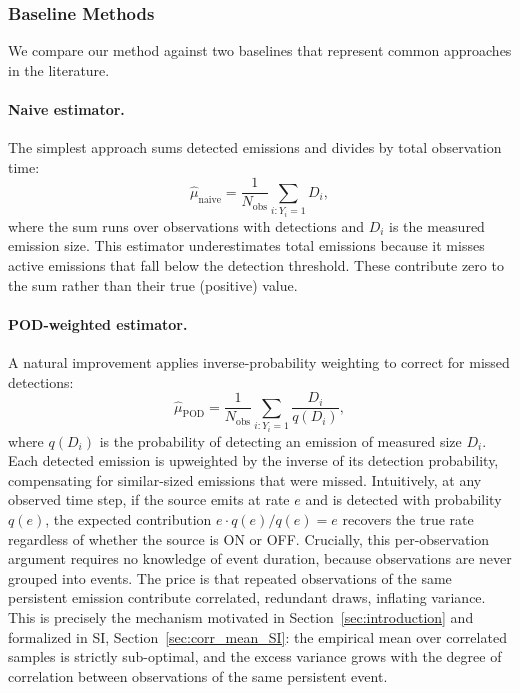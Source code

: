 \documentclass[unnumsec,webpdf,modern,mediumone]{oup-authoring-template}
\newcommand{\new}[1]{{\color{blue}#1}}
\begin{document}
\subsubsection{Baseline Methods}

We compare our method against two baselines that represent common approaches in the literature.

\paragraph{Naive estimator.}
The simplest approach sums detected emissions and divides by total observation time:
\begin{equation}
    \hat{\mu}_{\text{naive}} = \frac{1}{N_{\text{obs}}} \sum_{i: Y_i = 1} D_i,
\end{equation}
where the sum runs over observations with detections and $D_i$ is the measured emission size. This estimator underestimates total emissions because it misses active emissions that fall below the detection threshold. These contribute zero to the sum rather than their true (positive) value.

\paragraph{POD-weighted estimator.}
A natural improvement applies inverse-probability weighting to correct for missed detections:
\begin{equation}
    \hat{\mu}_{\text{POD}} = \frac{1}{N_{\text{obs}}} \sum_{i: Y_i = 1} \frac{D_i}{q(D_i)},
\end{equation}
where $q(D_i)$ is the probability of detecting an emission of measured size $D_i$. Each detected emission is upweighted by the inverse of its detection probability, compensating for similar-sized emissions that were missed. Intuitively, at any observed time step, if the source emits at rate $e$ and is detected with probability $q(e)$, the expected contribution $e \cdot q(e) / q(e) = e$ recovers the true rate regardless of whether the source is ON or OFF. Crucially, this per-observation argument requires no knowledge of event duration, because observations are never grouped into events. The price is that repeated observations of the same persistent emission contribute correlated, redundant draws, inflating variance. \new{This is precisely the mechanism motivated in Section~\ref{sec:introduction} and formalized in SI, Section~\ref{sec:corr_mean_SI}: the empirical mean over correlated samples is strictly sub-optimal, and the excess variance grows with the degree of correlation between observations of the same persistent event.} %
\end{document}
